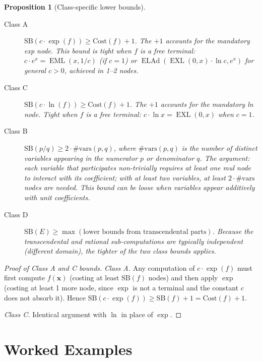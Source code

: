\documentclass[12pt,a4paper]{article}
\newtheorem{proposition}[theorem]{Proposition}
\theoremstyle{definition}
\newcommand{\EML}{\operatorname{EML}}
\newcommand{\EXL}{\operatorname{EXL}}
\newcommand{\ELAd}{\operatorname{ELAd}}
\newcommand{\Cost}{\mathrm{Cost}}
\newcommand{\SB}{\mathrm{SB}}
\begin{document}
\begin{proposition}[Class-specific lower bounds]\label{prop:classbounds}
~
\begin{description}
  \item[Class A] $\SB(c\cdot\exp(f)) \geq \Cost(f) + 1$.
        The $+1$ accounts for the mandatory exp node.
        This bound is \emph{tight} when $f$ is a free terminal:
        $c\cdot e^x = \EML(x, 1/c)$ (if $c=1$) or
        $\ELAd(\EXL(0,x)\cdot\ln c, e^x)$ for general $c > 0$,
        achieved in 1--2 nodes.
  \item[Class C] $\SB(c\cdot\ln(f)) \geq \Cost(f) + 1$.
        The $+1$ accounts for the mandatory ln node.
        Tight when $f$ is a free terminal: $c\cdot\ln x = \EXL(0,x)$ when $c=1$.
  \item[Class B] $\SB(p/q) \geq 2 \cdot \#\mathrm{vars}(p,q)$,
        where $\#\mathrm{vars}(p,q)$ is the number of distinct variables
        appearing in the numerator $p$ or denominator $q$.
        The argument: each variable that participates non-trivially requires
        at least one mul node to interact with its coefficient; with at least
        two variables, at least $2\cdot\#\mathrm{vars}$ nodes are needed.
        This bound can be loose when variables appear additively with unit
        coefficients.
  \item[Class D] $\SB(E) \geq \max(\text{lower bounds from transcendental parts})$.
        Because the transcendental and rational sub-computations are typically
        independent (different domain), the tighter of the two class bounds applies.
\end{description}
\end{proposition}

\begin{proof}[Proof of Class A and C bounds]
\emph{Class A.}
Any computation of $c\cdot\exp(f)$ must first compute $f(\mathbf{x})$ (costing
at least $\SB(f)$ nodes) and then apply $\exp$ (costing at least 1 more node,
since $\exp$ is not a terminal and the constant $c$ does not absorb it).
Hence $\SB(c\cdot\exp(f)) \geq \SB(f) + 1 = \Cost(f) + 1$.

\emph{Class C.}
Identical argument with $\ln$ in place of $\exp$.
\end{proof}

\section{Worked Examples}
\end{document}
